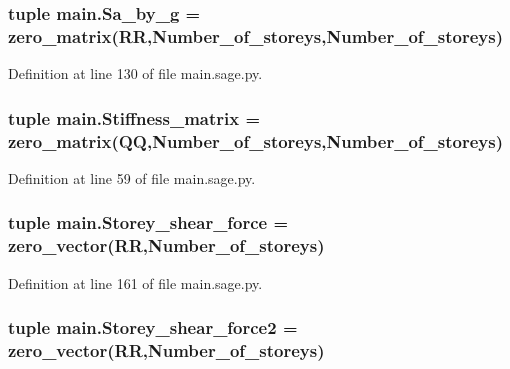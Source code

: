 \subsubsection[{Sa\+\_\+by\+\_\+g}]{\setlength{\rightskip}{0pt plus 5cm}tuple main.\+Sa\+\_\+by\+\_\+g = zero\+\_\+matrix(R\+R,Number\+\_\+of\+\_\+storeys,Number\+\_\+of\+\_\+storeys)}\label{a00039_a01374e7fea2c00172c845c7a5c71cfae}


Definition at line 130 of file main.\+sage.\+py.

\hypertarget{a00039_a0011be18dbc87087d6aaf28802f121c0}{}
\subsubsection[{Stiffness\+\_\+matrix}]{\setlength{\rightskip}{0pt plus 5cm}tuple main.\+Stiffness\+\_\+matrix = zero\+\_\+matrix(Q\+Q,Number\+\_\+of\+\_\+storeys,Number\+\_\+of\+\_\+storeys)}\label{a00039_a0011be18dbc87087d6aaf28802f121c0}


Definition at line 59 of file main.\+sage.\+py.

\hypertarget{a00039_aaa52e7055409dcf0785880422294a704}{}
\subsubsection[{Storey\+\_\+shear\+\_\+force}]{\setlength{\rightskip}{0pt plus 5cm}tuple main.\+Storey\+\_\+shear\+\_\+force = zero\+\_\+vector(R\+R,Number\+\_\+of\+\_\+storeys)}\label{a00039_aaa52e7055409dcf0785880422294a704}


Definition at line 161 of file main.\+sage.\+py.

\hypertarget{a00039_ad9f40bb3020e00eecaf17c078a1e61b6}{}
\subsubsection[{Storey\+\_\+shear\+\_\+force2}]{\setlength{\rightskip}{0pt plus 5cm}tuple main.\+Storey\+\_\+shear\+\_\+force2 = zero\+\_\+vector(R\+R,Number\+\_\+of\+\_\+storeys)}\label{a00039_ad9f40bb3020e00eecaf17c078a1e61b6}


